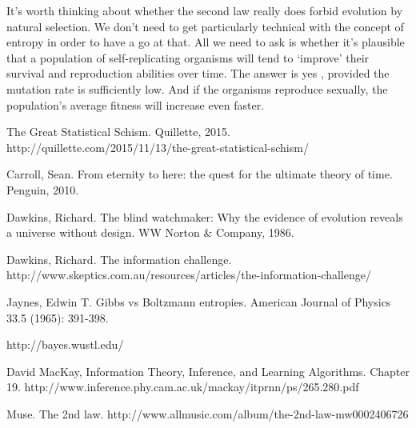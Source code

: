 \documentclass[a4paper, 12pt]{article}
\begin{document}
It's worth thinking about whether the second law really does forbid evolution
by natural selection. We don't need to get particularly technical with the
concept of entropy in order to have a go at that. All we need to ask is whether
it's plausible that a population of self-replicating organisms will tend to
`improve' their survival and reproduction abilities over time.
The answer is yes \citep{mackay}, provided the mutation rate is sufficiently
low. And if the organisms reproduce sexually, the population's average fitness
will increase even faster.


\begin{thebibliography}{999} %
 The Great Statistical Schism. Quillette, 2015.
http://quillette.com/2015/11/13/the-great-statistical-schism/

Carroll, Sean. From eternity to here: the quest for the ultimate theory of time. Penguin, 2010.

Dawkins, Richard. The blind watchmaker: Why the evidence of evolution reveals a universe without design. WW Norton \& Company, 1986.

Dawkins, Richard. The information challenge.
http://www.skeptics.com.au/resources/articles/the-information-challenge/

Jaynes, Edwin T.
Gibbs vs Boltzmann entropies. American Journal of Physics 33.5 (1965): 391-398.

http://bayes.wustl.edu/

David MacKay, Information Theory, Inference, and Learning Algorithms.
Chapter 19.
http://www.inference.phy.cam.ac.uk/mackay/itprnn/ps/265.280.pdf

Muse. The 2nd law.
http://www.allmusic.com/album/the-2nd-law-mw0002406726
\end{thebibliography}
\end{document}
